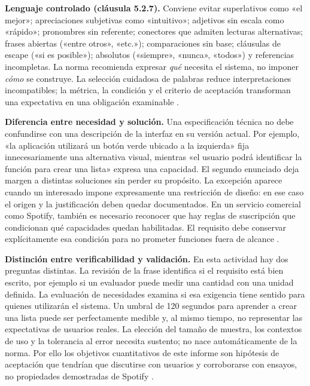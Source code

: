 \textbf{Lenguaje controlado (cláusula 5.2.7).} Conviene evitar superlativos como «el mejor»; apreciaciones subjetivas como «intuitivo»; adjetivos sin escala como «rápido»; pronombres sin referente; conectores que admiten lecturas alternativas; frases abiertas («entre otros», «etc.»); comparaciones sin base; cláusulas de escape («si es posible»); absolutos («siempre», «nunca», «todos») y referencias incompletas. La norma recomienda expresar \emph{qué} necesita el sistema, no imponer \emph{cómo} se construye. La selección cuidadosa de palabras reduce interpretaciones incompatibles; la métrica, la condición y el criterio de aceptación transforman una expectativa en una obligación examinable \cite{iso29148}.

\textbf{Diferencia entre necesidad y solución.} Una especificación técnica no debe confundirse con una descripción de la interfaz en su versión actual. Por ejemplo, «la aplicación utilizará un botón verde ubicado a la izquierda» fija innecesariamente una alternativa visual, mientras «el usuario podrá identificar la función para crear una lista» expresa una capacidad. El segundo enunciado deja margen a distintas soluciones sin perder su propósito. La excepción aparece cuando un interesado impone expresamente una restricción de diseño: en ese caso el origen y la justificación deben quedar documentados. En un servicio comercial como Spotify, también es necesario reconocer que hay reglas de suscripción que condicionan qué capacidades quedan habilitadas. El requisito debe conservar explícitamente esa condición para no prometer funciones fuera de alcance \cite{iso29148,spotify-playlists}.

\textbf{Distinción entre verificabilidad y validación.} En esta actividad hay dos preguntas distintas. La revisión de la frase identifica si el requisito está bien escrito, por ejemplo si un evaluador puede medir una cantidad con una unidad definida. La evaluación de necesidades examina si esa exigencia tiene sentido para quienes utilizarán el sistema. Un umbral de 120 segundos para aprender a crear una lista puede ser perfectamente medible y, al mismo tiempo, no representar las expectativas de usuarios reales. La elección del tamaño de muestra, los contextos de uso y la tolerancia al error necesita sustento; no nace automáticamente de la norma. Por ello los objetivos cuantitativos de este informe son hipótesis de aceptación que tendrían que discutirse con usuarios y corroborarse con ensayos, no propiedades demostradas de Spotify \cite{iso29148,iso25010}.

